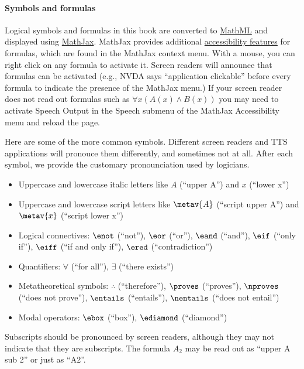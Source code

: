 \paragraph{Symbols and formulas} 

Logical symbols and formulas in this book are converted to
\href{https://www.w3.org/Math/}{MathML} and displayed using
\href{https://www.mathjax.org/}{MathJax}. MathJax provides additional
\href{https://docs.mathjax.org/en/latest/basic/accessibility.html}{accessibility
features} for formulas, which are found in the MathJax context menu.
With a mouse, you can right click on any formula to activate it.
Screen readers will announce that formulas can be activated (e.g.,
NVDA says ``application clickable'' before every formula to indicate
the presence of the MathJax menu.) If your screen reader does not read
out formulas such as $\forall x(A(x) \land B(x))$ you may need to
activate Speech Output in the Speech submenu of the MathJax
Accessibility menu and reload the page.

Here are some of the more common symbols. Different screen readers and
TTS applications will pronouce them differently, and sometimes not at
all. After each symbol, we provide the customary pronounciation used
by logicians.
\begin{itemize}
  \item Uppercase and lowercase italic letters like $A$ (``upper A'')
  and $x$ (``lower x'')
  \item Uppercase and lowercase script letters like $\metav{A}$
  (``script upper A'') and $\metav{x}$ (``script lower x'')
  \item Logical connectives: $\enot$ (``not''), $\eor$ (``or''),
  $\eand$ (``and''), $\eif$ (``only if''), $\eiff$ (``if and only if''), $\ered$ (``contradiction'')
  \item Quantifiers: $\forall$ (``for all''), $\exists$ (``there exists'')
  \item Metatheoretical symbols: $\therefore$ (``therefore''),
  $\proves$ (``proves''), $\nproves$ (``does not prove''), $\entails$ (``entails''), $\nentails$ (``does not entail'')
  \item Modal operators: $\ebox$ (``box''), $\ediamond$ (``diamond'')
\end{itemize}

Subscripts should be pronounced by screen readers, although
they may not indicate that they are subscripts. The formula $A_2$ may
be read out as ``upper A sub 2'' or just as ``A2''.

